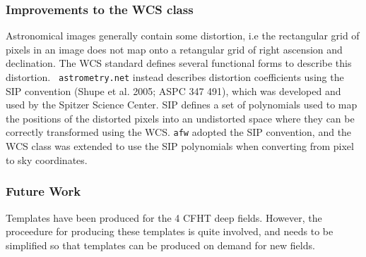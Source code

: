 %

\subsubsection{Improvements to the WCS class}
Astronomical images generally contain some distortion, i.e the
rectangular grid of pixels in an image does not map onto a retangular
grid of right ascension and declination. The WCS standard defines
several functional forms to describe this distortion.  {\tt
  astrometry.net} instead describes distortion coefficients using the SIP
convention (Shupe et al. 2005; ASPC 347 491), which was developed and
used by the Spitzer Science Center. SIP defines a set of polynomials
used to map the positions of the distorted pixels into an undistorted
space where they can be correctly transformed using the WCS. {\tt afw}
adopted the SIP convention, and the WCS class was extended to use the
SIP polynomials when converting from pixel to sky coordinates.


\subsubsection{Future Work}
Templates have been produced for the 4 CFHT deep fields. However, the proceedure for producing these templates is quite involved, and needs to be simplified so that templates can be produced on demand for new fields.
